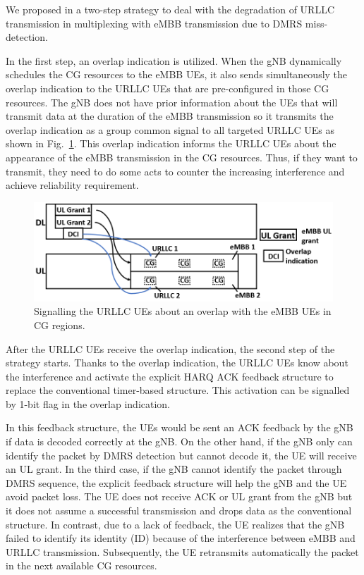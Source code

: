 \documentclass{ieeeaccess}
\begin{document}
We proposed in \cite{ad99} a two-step strategy to deal with the degradation of URLLC transmission in multiplexing with eMBB transmission due to DMRS miss-detection.

In the first step, an overlap indication is utilized. When the gNB dynamically schedules the CG resources to the eMBB UEs, it also sends simultaneously the overlap indication to the URLLC UEs that are pre-configured in those CG resources. The gNB does not have prior information about the UEs that will transmit data at the duration of the eMBB transmission so it transmits the overlap indication as a group common signal to all targeted URLLC UEs as shown in Fig.~\ref{fig2}. This overlap indication informs the URLLC UEs about the appearance of the eMBB transmission in the CG resources. Thus, if they want to transmit, they need to do some acts to counter the increasing interference and achieve reliability requirement.

\begin{figure}[htbp]
\centerline{\includegraphics[scale=0.32]{fig2.PNG}}
\caption{Signalling the URLLC UEs about an overlap with the eMBB UEs in CG regions.}
\label{fig2}
\vspace{-2mm}
\end{figure}

After the URLLC UEs receive the overlap indication, the second step of the strategy starts. Thanks to the overlap indication, the URLLC UEs know about the interference and activate the explicit HARQ ACK feedback structure to replace the conventional timer-based structure. This activation can be signalled by 1-bit flag in the overlap indication. 

In this feedback structure, the UEs would be sent an ACK feedback by the gNB if data is decoded correctly at the gNB. On the other hand, if the gNB only can identify the packet by DMRS detection but cannot decode it, the UE will receive an UL grant. In the third case, if the gNB cannot identify the packet through DMRS sequence, the explicit feedback structure will help the gNB and the UE avoid packet loss. The UE does not receive ACK or UL grant from the gNB but it does not assume a successful transmission and drops data as the conventional structure. In contrast, due to a lack of feedback, the UE realizes that the gNB failed to identify its identity (ID) because of the interference between eMBB and URLLC transmission. Subsequently, the UE retransmits automatically the packet in the next available CG resources. 
\end{document}
